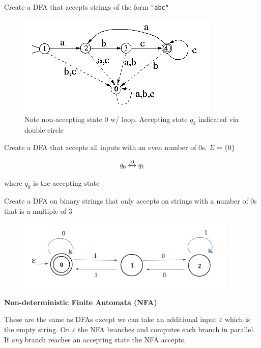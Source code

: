 \documentclass[../notes.tex]{subfiles}
\begin{document}
\begin{example}
		Create a DFA that accepts strings of the form \texttt{"abc"}
		\begin{figure}[H]
			\centering
			\includegraphics[width=0.8\linewidth]{img/image_2022-11-24-16-18-31.png}
			\caption{Note non-accepting state 0 w/ loop. Accepting state $ q_3 $ indicated via double circle}
		\end{figure}
\end{example}

\begin{example}
	Create a DFA that accepts all inputs with an even number of 0s. $ \Sigma = \{0\}  $


	\begin{equation}
		q_0 \xleftrightarrow{0} q_1
	\end{equation}

	where $ q_0 $ is the accepting state
\end{example}


\begin{example}
	Create a DFA on binary strings that only accepts on strings with a number of 0s that is a multiple of 3

	\begin{figure}[H]
		\centering
		\includegraphics[width=0.8\linewidth]{img/image_2022-11-24-16-25-14.png}
	\end{figure}
	




\end{example}



\begin{definition}
	\textbf{Non-deterministic Finite Automata (NFA)} 

	These are the same as DFAs except we can take an additional input $ \varepsilon $ which is the empty string. On $ \varepsilon $ the NFA branches and computes each branch in parallel. If \textit{any} branch reaches an accepting state the NFA accepts.
\end{definition}
\end{document}
